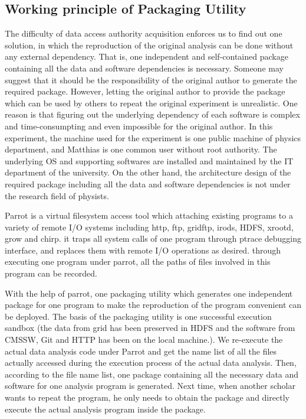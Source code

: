 \documentclass{acm_proc_article-sp}
\begin{document}
\subsection{Working principle of Packaging Utility}
The difficulty of data access authority acquisition enforces us to find out one solution, in which the reproduction of the original analysis can be done without any external dependency. That is, one independent and self-contained package containing all the data and software dependencies is necessary. Someone may suggest that it should be the responsibility of the original author to generate the required package. However, letting the original author to provide the package which can be used by others to repeat the original experiment is unrealistic. One reason is that figuring out the underlying dependency of each software is complex and time-consumpting and even impossible for the original author. In this experiment, the machine used for the experiment is one public machine of physics department, and Matthias is one common user without root authority. The underlying OS and supporting softwares are installed and maintained by the IT department of the university. On the other hand, the architecture design of the required package including all the data and software dependencies is not under the research field of physists.

Parrot is a virtual filesystem access tool which attaching existing programs to a variety of remote I/O systems including http, ftp, gridftp, irods, HDFS, xrootd, grow and chirp. it traps all system calls of one program through ptrace debugging interface, and replaces them with remote I/O operations as desired. through executing one program under parrot, all the paths of files involved in this program can be recorded.  

With the help of parrot, one packaging utility which generates one independent package for one program to make the reproduction of the program convenient can be deployed. The basis of the packaging utility is one successful execution sandbox (the data from grid has been preserved in HDFS and the software from CMSSW, Git and HTTP has been on the local machine.). We re-execute the actual data analysis code under Parrot and get the name list of all the files actually accessed during the execution process of the actual data analysis. Then, according to the file name list, one package containing all the necessary data and software for one analysis program is generated. Next time, when another scholar wants to repeat the program, he only needs to obtain the package and directly execute the actual analysis program inside the package.
\end{document}
